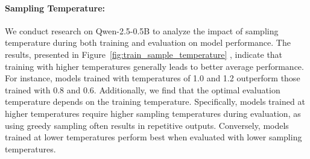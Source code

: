 


\paragraph{Sampling Temperature:} We conduct research on Qwen-2.5-0.5B to analyze the impact of sampling temperature during both training and evaluation on model performance. The results, presented in Figure~\ref{fig:train_sample_temperature} , indicate that training with higher temperatures generally leads to better average performance. For instance, models trained with temperatures of 1.0 and 1.2 outperform those trained with 0.8 and 0.6. Additionally, we find that the optimal evaluation temperature depends on the training temperature. Specifically, models trained at higher temperatures require higher sampling temperatures during evaluation, as using greedy sampling often results in repetitive outputs. Conversely, models trained at lower temperatures perform best when evaluated with lower sampling temperatures.

